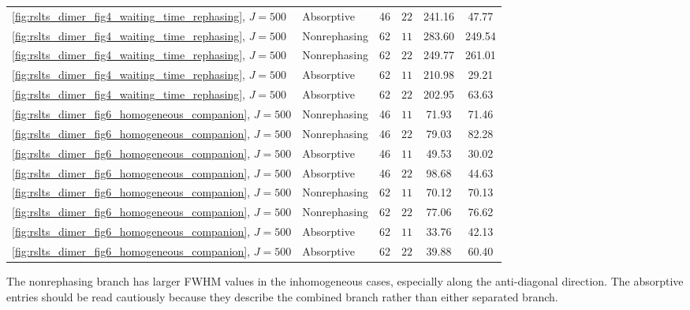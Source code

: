 \begin{table}[htbp]
\begin{tabular}{@{}llcccc@{}}
        \autoref{fig:rslts_dimer_fig4_waiting_time_rephasing}, $J=500$ & Absorptive & 46 & $22$ & 241.16 & 47.77 \\
        \autoref{fig:rslts_dimer_fig4_waiting_time_rephasing}, $J=500$ & Nonrephasing & 62 & $11$ & 283.60 & 249.54 \\
        \autoref{fig:rslts_dimer_fig4_waiting_time_rephasing}, $J=500$ & Nonrephasing & 62 & $22$ & 249.77 & 261.01 \\
        \autoref{fig:rslts_dimer_fig4_waiting_time_rephasing}, $J=500$ & Absorptive & 62 & $11$ & 210.98 & 29.21 \\
        \autoref{fig:rslts_dimer_fig4_waiting_time_rephasing}, $J=500$ & Absorptive & 62 & $22$ & 202.95 & 63.63 \\
        \autoref{fig:rslts_dimer_fig6_homogeneous_companion}, $J=500$ & Nonrephasing & 46 & $11$ & 71.93 & 71.46 \\
        \autoref{fig:rslts_dimer_fig6_homogeneous_companion}, $J=500$ & Nonrephasing & 46 & $22$ & 79.03 & 82.28 \\
        \autoref{fig:rslts_dimer_fig6_homogeneous_companion}, $J=500$ & Absorptive & 46 & $11$ & 49.53 & 30.02 \\
        \autoref{fig:rslts_dimer_fig6_homogeneous_companion}, $J=500$ & Absorptive & 46 & $22$ & 98.68 & 44.63 \\
        \autoref{fig:rslts_dimer_fig6_homogeneous_companion}, $J=500$ & Nonrephasing & 62 & $11$ & 70.12 & 70.13 \\
        \autoref{fig:rslts_dimer_fig6_homogeneous_companion}, $J=500$ & Nonrephasing & 62 & $22$ & 77.06 & 76.62 \\
        \autoref{fig:rslts_dimer_fig6_homogeneous_companion}, $J=500$ & Absorptive & 62 & $11$ & 33.76 & 42.13 \\
        \autoref{fig:rslts_dimer_fig6_homogeneous_companion}, $J=500$ & Absorptive & 62 & $22$ & 39.88 & 60.40 \\
        \bottomrule
    \end{tabular}
\end{table}

The nonrephasing branch has larger FWHM values in the inhomogeneous cases,
especially along the anti-diagonal direction. The absorptive entries should be
read cautiously because they describe the combined branch rather than either
separated branch.
